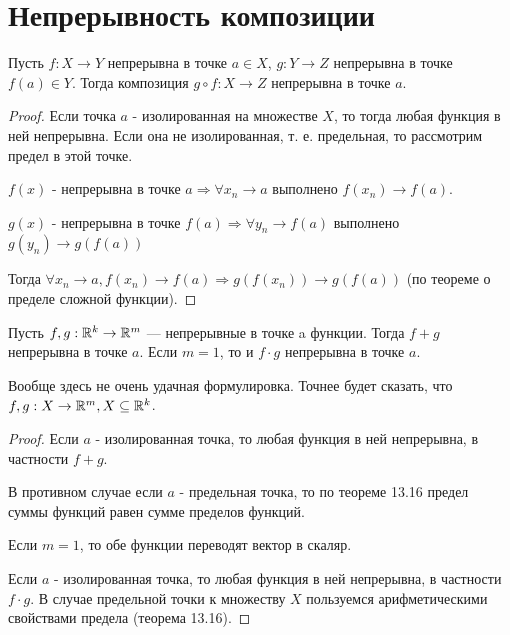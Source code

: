     \section{Непрерывность композиции}
    
    \begin{sentence}
    	Пусть $f : X \rightarrow Y$ непрерывна в точке $a \in X$, $g : Y \rightarrow Z$ непрерывна в точке $f(a) \in Y$. Тогда композиция $g \circ f : X \rightarrow Z$ непрерывна в точке $a$.
    \end{sentence}
    
    \begin{proof}
    	Если точка $a$ - изолированная на множестве $X$, то тогда любая функция в ней непрерывна. Если она не изолированная, т. е. предельная, то рассмотрим предел в этой точке.
    	
    	$f(x)$ - непрерывна в точке $a \Rightarrow \forall x_n \to a$ выполнено $f(x_n) \to f(a)$.
    	
    	$g(x)$ - непрерывна в точке $f(a) \Rightarrow \forall y_n \to f(a)$ выполнено $g(y_n) \to g(f(a))$
    	
    	Тогда $\forall x_n \to a, f(x_n) \to f(a) \Rightarrow g(f(x_n)) \to g(f(a))$ (по теореме о пределе сложной функции).
    \end{proof}
    
    \begin{sentence}
    Пусть $f, g : \mathbb R^k \rightarrow \mathbb R^m$ — непрерывные в точке a функции. Тогда $f + g$ непрерывна в точке $a$. Если $m = 1$, то и $f \cdot g$ непрерывна в точке $a$.
    \end{sentence}
    
    Вообще здесь не очень удачная формулировка. Точнее будет сказать, что $f, g : X \rightarrow \mathbb R^m, X \subseteq \mathbb R^k$.
    
    \begin{proof}
    	Если $a$ - изолированная точка, то любая функция в ней непрерывна, в частности $f + g$.
    	
    	В противном случае если $a$ - предельная точка, то по теореме 13.16 предел суммы функций равен сумме пределов функций.
    	
    	Если $m = 1$, то обе функции переводят вектор в скаляр.
    	
    	Если $a$ - изолированная точка, то любая функция в ней непрерывна, в частности $f \cdot g$. В случае предельной точки к множеству $X$ пользуемся арифметическими свойствами предела (теорема 13.16).
    \end{proof}
    
